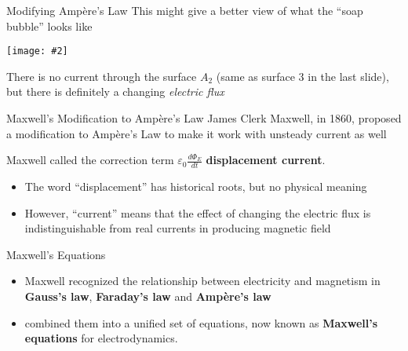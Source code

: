 \documentclass[12pt,aspectratio=169]{beamer}
\newcommand{\pic}[2]{\texttt{[image: \#2]}}\newcommand{\mb}[1]{\mathbf{#1}}
\newcommand{\eq}[2]{\vspace{#1}{\Large\begin{displaymath}#2\end{displaymath}}}
\begin{document}
\begin{frame}{Modifying Amp\`{e}re's Law}
  This might give a better view of what the ``soap bubble'' looks like
  \begin{center}
    \pic{.5}{bubble.png}
  \end{center}
  There is no current through the surface $A_2$ (same as surface \num{3} in the
  last slide), but there is definitely a changing \emph{electric flux}
\end{frame}



\begin{frame}{Maxwell's Modification to Amp\`{e}re's Law}
  James Clerk Maxwell, in 1860, proposed a modification to Amp\`{e}re's Law
  to make it work with unsteady current as well

  \eq{-.1in}{
    \boxed{
      \oint\mb{B}\cdot d\boldsymbol{\ell}=\mu_0 I +
      \mu_0\varepsilon_0 \frac{d\Phi_E}{dt}
    }
  }

  Maxwell called the correction term
  $\displaystyle \varepsilon_0\frac{d\Phi_E}{dt}$
  \textbf{displacement current}.
  \begin{itemize}
  \item The word ``displacement'' has historical roots, but no physical meaning
  \item However, ``current'' means that the effect of changing the electric
    flux is indistinguishable from real currents in producing magnetic field
  \end{itemize}
\end{frame}



\begin{frame}{Maxwell's Equations}
  \begin{itemize}
  \item Maxwell recognized the relationship between electricity and
    magnetism in \textbf{Gauss's law}, \textbf{Faraday's law} and
    \textbf{Amp\`{e}re's law}
  \item combined them into a unified set of equations, now known as
    \textbf{Maxwell's equations} for electrodynamics.
  \end{itemize}
\end{frame}
\end{document}
